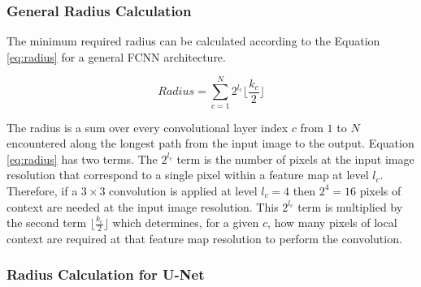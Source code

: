 \documentclass[runningheads]{llncs}
\begin{document}
\subsubsection{General Radius Calculation}
The minimum required radius can be calculated according to the Equation \ref{eq:radius} for a general FCNN architecture. 

\begin{equation}
Radius = \sum_{c=1}^{N} 2^{l_c} \lfloor \frac{k_c}{2} \rfloor
\label{eq:radius}
\end{equation}

The radius is a sum over every convolutional layer index $c$ from $1$ to $N$ encountered along the longest path from the input image to the output.
Equation \ref{eq:radius} has two terms. The $2^{l_c}$ term is the number of pixels at the input image resolution that correspond to a single pixel within a feature map at level $l_c$. Therefore, if a $3 \times 3$ convolution is applied at level $l_c=4$ then $2^4 = 16$ pixels of context are needed at the input image resolution. This $2^{l_c}$ term is multiplied by the second term $\lfloor \frac{k_c}{2} \rfloor$ which determines, for a given $c$, how many pixels of local context are required at that feature map resolution to perform the convolution.

\subsubsection{Radius Calculation for U-Net}


\end{document}
